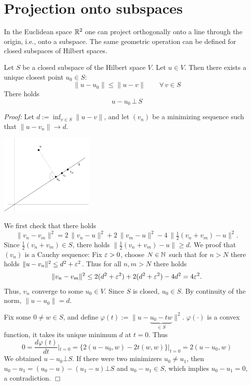 \section{Projection onto subspaces}

In the Euclidean space ${\mathbb R}^2$ one can project orthogonally onto a
line through the origin, i.e., onto a subspace. The same geometric
operation can be defined for closed subspaces of Hilbert spaces.

\begin{theorem} \label{theo_proj}
Let $S$ be a closed subspace of the Hilbert space $V$. 
Let $u \in V$. Then there exists a unique closest point $u_0 \in S$:
$$
\| u - u_0 \| \leq \| u - v \| \qquad \forall \, v \in S
$$
There holds
$$
u - u_0 \, \bot \, S
$$
\end{theorem}
\noindent
{\em Proof:} Let $d := \inf_{v \in S} \| u - v\|$, and let $(v_n)$ be
a minimizing sequence such that $\| u - v_n \| \rightarrow d$.

\begin{center}
\includegraphics[height=4cm]{pictures/project}
\end{center}


We first check that there holds
$$
\| v_n - v_m \|^2 = 2 \, \| v_n - u \|^2 + 2 \, \| v_m - u \|^2 - 4 \,  \| \tfrac{1}{2}(v_n+v_m) - u \|^2.
$$
Since $\tfrac{1}{2} (v_n+v_m) \in S$, there holds $\| \tfrac{1}{2} (v_n+v_m) - u \| \geq d$.
We proof that $(v_n)$ is a Cauchy sequence:
Fix $\varepsilon > 0$, choose $N \in {\mathbb N}$ such that for $n > N$ there holds
$\| u - v_n \|^2 \leq d^2 + \varepsilon^2$. Thus for all $n,m > N$ there holds
$$
\| v_n - v_m \|^2 \leq 2 (d^2+\varepsilon^2) + 2 (d^2 + \varepsilon^2) - 4 d^2 = 4 \varepsilon^2.
$$ 
Thus, $v_n$ converge to some $u_0 \in V$. Since $S$ is closed, $u_0 \in S$.
By continuity of the norm, $\| u - u_0 \| = d$.

\medskip
Fix some $0 \neq w \in S$, and define $\varphi(t) := \| u - \underbrace{u_0 - t w}_{\in S} \|^2$.
$\varphi(\cdot)$ is a convex function, it takes its unique minimum $d$ at $t=0$. Thus
$$
0 = \frac{d \varphi(t)}{dt}|_{t=0} = \{ 2 (u-u_0, w) - 2 t (w,w) \} |_{t=0} = 
   2 (u-u_0,w)
$$ 
We obtained $u-u_0 \bot S$. If there were two minimizers $u_0 \neq u_1$, 
then $u_0-u_1 = (u_0-u) - (u_1-u) \bot S$ and $u_0-u_1 \in S$, which implies
$u_0-u_1 = 0$, a contradiction.
\hfill $\Box$

